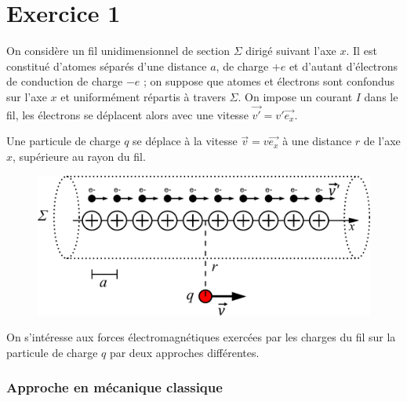 \documentclass{report}
\begin{document}
\section*{Exercice 1}

On considère un fil unidimensionnel de section $\Sigma$ dirigé suivant l'axe $x$. Il est constitué d'atomes séparés d'une distance $a$, de charge $+e$  et d'autant d'électrons de conduction de charge $-e$ ; on suppose que atomes et électrons sont confondus sur l'axe $x$ et uniformément répartis à travers $\Sigma$. On impose un courant $I$ dans le fil, les électrons se déplacent alors avec une vitesse $\vec{v'}=v'\vec{e_{x}}$.

Une particule de charge $q$ se déplace à la vitesse $\vec{v}=v\vec{e_{x}}$ à une distance $r$ de l'axe $x$, supérieure au rayon du fil.

\begin{figure}[h!]
\centering
		\includegraphics[scale=0.25]{cable.pdf}
\end{figure}

On s'intéresse aux forces électromagnétiques exercées par les charges du fil sur la particule de charge $q$ par deux approches différentes.

\subsubsection*{Approche en mécanique classique}
\end{document}
